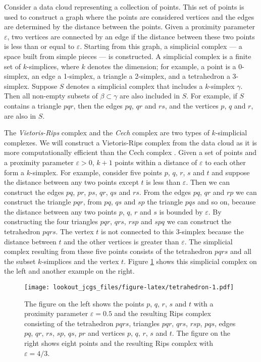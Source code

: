 \documentclass[12pt]{article}
\theoremstyle{definition}
\theoremstyle{definition}
\theoremstyle{definition}
\theoremstyle{definition}
\theoremstyle{remark}
\begin{document}
Consider a data cloud representing a collection of points. This set of points is used to construct a graph where the points are considered vertices and the edges are determined by the distance between the points. Given a proximity parameter \(\varepsilon\), two vertices are connected by an edge if the distance between these two points is less than or equal to \(\varepsilon\). Starting from this graph, a simplicial complex --- a space built from simple pieces --- is constructed. A simplicial complex is a finite set of \(k\)-simplices, where \(k\) denotes the dimension; for example, a point is a 0-simplex, an edge a 1-simplex, a triangle a 2-simplex, and a tetrahedron a 3-simplex. Suppose \(S\) denotes a simplicial complex that includes a \(k\)-simplex \(\gamma\). Then all non-empty subsets of \(\beta \subset \gamma\) are also included in \(S\). For example, if \(S\) contains a triangle \(pqr\), then the edges \(pq\), \(qr\) and \(rs\), and the vertices \(p\), \(q\) and \(r\), are also in \(S\).

The \emph{Vietoris-Rips} complex and the \emph{Cech} complex are two types of \(k\)-simplicial complexes. We will construct a Vietoris-Rips complex from the data cloud as it is more computationally efficient than the Cech complex \citep{ghrist2008barcodes}. Given a set of points and a proximity parameter \(\varepsilon > 0\), \(k+1\) points within a distance of \(\varepsilon\) to each other form a \(k\)-simplex. For example, consider five points \(p\), \(q\), \(r\), \(s\) and \(t\) and suppose the distance between any two points except \(t\) is less than \(\varepsilon\). Then we can construct the edges \(pq\), \(pr\), \(ps\), \(qr\), \(qs\) and \(rs\). From the edges \(pq\), \(qr\) and \(rp\) we can construct the triangle \(pqr\), from \(pq\), \(qs\) and \(sp\) the triangle \(pqs\) and so on, because the distance between any two points \(p\), \(q\), \(r\) and \(s\) is bounded by \(\varepsilon\). By constructing the four triangles \(pqr\), \(qrs\), \(rsp\) and \(spq\) we can construct the tetrahedron \(pqrs\). The vertex \(t\) is not connected to this 3-simplex because the distance between \(t\) and the other vertices is greater than \(\varepsilon\). The simplicial complex resulting from these five points consists of the tetrahedron \(pqrs\) and all the subset \(k\)-simplices and the vertex \(t\). Figure \ref{fig:tetrahedron} shows this simplicial complex on the left and another example on the right.

\begin{figure}
\centering
\texttt{[image: lookout\_jcgs\_files/figure-latex/tetrahedron-1.pdf]}
\caption{\label{fig:tetrahedron}The figure on the left shows the points \(p\), \(q\), \(r\), \(s\) and \(t\) with a proximity parameter \(\varepsilon = 0.5\) and the resulting Rips complex consisting of the tetrahedron \(pqrs\), triangles \(pqr\), \(qrs\), \(rsp\), \(pqs\), edges \(pq\), \(qr\), \(rs\), \(sp\), \(qs\), \(pr\) and vertices \(p\), \(q\), \(r\), \(s\) and \(t\). The figure on the right shows eight points and the resulting Rips complex with \(\varepsilon=4/3\).}
\end{figure}
\end{document}
